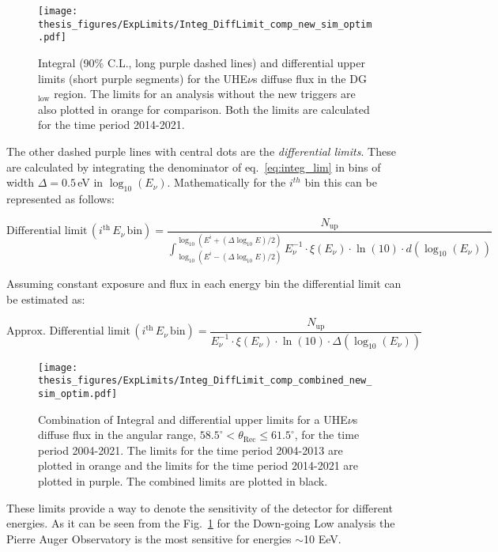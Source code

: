 \begin{figure}[t!]
  \centering
  \texttt{[image: thesis\_figures/ExpLimits/Integ\_DiffLimit\_comp\_new\_sim\_optim.pdf]}
  \caption{Integral (90\% C.L., long purple dashed lines) and differential upper limits (short purple segments) for the UHE$\nu$s diffuse flux in the DG$\mathrm{_{\text{low}}}$ region. The limits for an analysis without the new triggers are also plotted in orange for comparison. Both the limits are calculated for the time period 2014-2021.}
  \label{fig:Limit_comp_1}
\end{figure}

The other dashed purple lines with central dots are the \textit{differential limits}. These are calculated by integrating the denominator of eq.~\ref{eq:integ_lim} in bins of width $\Delta = 0.5\,$eV in $\log_{10}(E_{\nu})$. Mathematically for the $i^{th}$ bin this can be represented as follows:

\begin{equation}
  \label{eq:diff_lim}
  \text{Differential limit} \, (i^{\text{th}} \, E_{\nu} \, \text{bin})  = \frac{N_{\text{up}}}{\int_{\log_{10}(E^i - (\Delta \log_{10}E)/2)}^{\log_{10}(E^i + (\Delta \log_{10}E)/2)} E^{-1}_{\nu} \cdot \xi(E_{\nu}) \cdot \ln(10) \cdot d(\log_{10}(E_{\nu}))}
\end{equation}

Assuming constant exposure and flux in each energy bin the differential limit can be estimated as:

\begin{equation}
  \label{eq:diff_lim_approx}
 \text{Approx. Differential limit} \, (i^{\text{th}} \, E_{\nu} \, \text{bin})  = \frac{N_{\text{up}}}{E^{-1}_{\nu} \cdot \xi(E_{\nu}) \cdot \ln(10) \cdot \Delta (\log_{10}(E_{\nu}))}
\end{equation}
\begin{figure}[t!]
  \centering
  \texttt{[image: thesis\_figures/ExpLimits/Integ\_DiffLimit\_comp\_combined\_new\_sim\_optim.pdf]}
  \caption{Combination of Integral and differential upper limits for a UHE$\nu$s diffuse flux in the angular range, $ 58.5^{\circ} <\theta_{\text{Rec}} \leq 61.5^{\circ}$, for the time period 2004-2021. The limits for the time period 2004-2013 are plotted in orange and the limits for the time period 2014-2021 are plotted in purple. The combined limits are plotted in black.}
  \label{fig:Limit_comp_2}
\end{figure}

These limits provide a way to denote the sensitivity of the detector for different energies. As it can be seen from the Fig.~\ref{fig:Limit_comp_1} for the Down-going Low analysis the Pierre Auger Observatory is the most sensitive for energies $\sim$10 EeV. 

